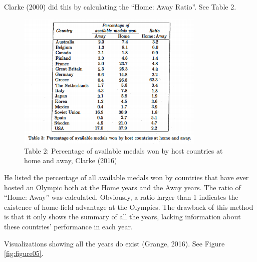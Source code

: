 \documentclass[
]{article}
\begin{document}
Clarke (2000) did this by calculating the ``Home: Away Ratio''. See Table 2.

\begin{figure}
\centering
\includegraphics[width=0.8\textwidth,height=\textheight]{static/pics/2-3.png}
\caption{Table 2: Percentage of available medals won by host countries at home and away, Clarke (2016)}
\end{figure}

He listed the percentage of all available medals won by countries that have ever hosted an Olympic both at the Home years and the Away years. The ratio of ``Home: Away'' was calculated. Obviously, a ratio larger than 1 indicates the existence of home-field advantage at the Olympics. The drawback of this method is that it only shows the summary of all the years, lacking information about these countries' performance in each year.

Visualizations showing all the years do exist (Grange, 2016). See Figure \ref{fig:figure05}.
\end{document}
